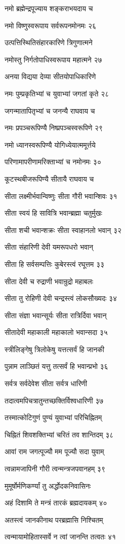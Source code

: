 नमो ब्रह्मेन्द्रपूज्याय शङ्कराभयदाय च

नमो विष्णुस्वरूपाय सर्वरूपनमोनमः २६

उत्पत्तिस्थितिसंहारकारिणे त्रिगुणात्मने

नमोस्तु निर्गतोपाधिस्वरूपाय महात्मने २७

अनया विद्यया देव्या सीतयोपाधिकारिणे

नमः पुम्प्रकृतिभ्यां च युवाभ्यां जगतां कृते २८

जगन्मातापितृभ्यां च जनन्यै राघवाय च

नमः प्रपञ्चरूपिण्यै निष्प्रपञ्चस्वरूपिणे २९

नमो ध्यानस्वरूपिण्यै योगिध्येयात्ममूर्त्तये

परिणामापरीणामरिक्ताभ्यां च नमोनमः ३०

कूटस्थबीजरूपिण्यै सीतायै राघवाय च

सीता लक्ष्मीर्भवान्विष्णुः सीता गौरी भवान्शिवः ३१

सीता स्वयं हि सावित्रि भवान्ब्रह्मा चतुर्मुखः

सीता शची भवान्शक्रः सीता स्वाहानलो भवान् ३२

सीता संहारिणी देवी यमरूपधरो भवान्

सीता हि सर्वसम्पत्तिः कुबेरस्त्वं रघूत्तम ३३

सीता देवी च रुद्राणी भवान्रुद्रो महाबलः

सीता तु रोहिणी देवी चन्द्रस्त्वं लोकसौख्यदः ३४

सीता संज्ञा भवान्सूर्यः सीता रात्रिर्दिवा भवान्

सीतादेवी महाकाली महाकालो भवान्सदा ३५

स्त्रीलिङ्गेषु त्रिलोकेषु यत्तत्सर्वं हि जानकी

पुन्नाम लाञ्छितं यत्तु तत्सर्वं हि भवान्प्रभो ३६

सर्वत्र सर्वदेवेश सीता सर्वत्र धारिणी

तदात्वमपिचत्रातुन्तच्छक्तिर्विश्वधारिणी ३७

तस्मात्कोटिगुणं पुण्यं युवाभ्यां परिचिह्नितम्

चिह्नितं शिवशक्तिभ्यां चरितं तव शान्तिदम् ३८

आवां राम जगत्पूज्यौ मम पूज्यौ सदा युवाम्

त्वन्नामजापिनी गौरी त्वन्मन्त्रजपवानहम् ३९

मुमूर्षोर्मणिकर्ण्यां तु अर्द्धोदकनिवासिनः

अहं दिशामि ते मन्त्रं तारकं ब्रह्मदायकम् ४०

अतस्त्वं जानकीनाथ परब्रह्मासि निश्चितम्

त्वन्मायामोहितास्सर्वे न त्वां जानन्ति तत्वतः ४१

